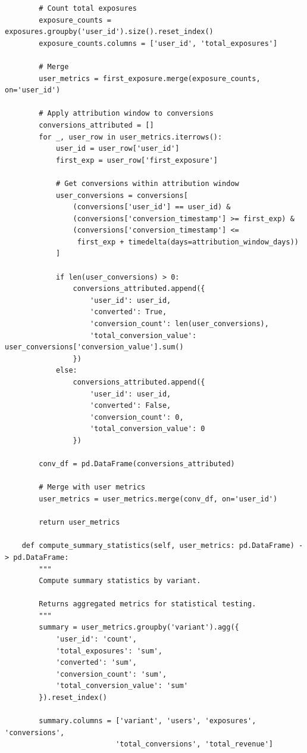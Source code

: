 \begin{lstlisting}
        # Count total exposures
        exposure_counts = exposures.groupby('user_id').size().reset_index()
        exposure_counts.columns = ['user_id', 'total_exposures']

        # Merge
        user_metrics = first_exposure.merge(exposure_counts, on='user_id')

        # Apply attribution window to conversions
        conversions_attributed = []
        for _, user_row in user_metrics.iterrows():
            user_id = user_row['user_id']
            first_exp = user_row['first_exposure']

            # Get conversions within attribution window
            user_conversions = conversions[
                (conversions['user_id'] == user_id) &
                (conversions['conversion_timestamp'] >= first_exp) &
                (conversions['conversion_timestamp'] <=
                 first_exp + timedelta(days=attribution_window_days))
            ]

            if len(user_conversions) > 0:
                conversions_attributed.append({
                    'user_id': user_id,
                    'converted': True,
                    'conversion_count': len(user_conversions),
                    'total_conversion_value': user_conversions['conversion_value'].sum()
                })
            else:
                conversions_attributed.append({
                    'user_id': user_id,
                    'converted': False,
                    'conversion_count': 0,
                    'total_conversion_value': 0
                })

        conv_df = pd.DataFrame(conversions_attributed)

        # Merge with user metrics
        user_metrics = user_metrics.merge(conv_df, on='user_id')

        return user_metrics

    def compute_summary_statistics(self, user_metrics: pd.DataFrame) -> pd.DataFrame:
        """
        Compute summary statistics by variant.

        Returns aggregated metrics for statistical testing.
        """
        summary = user_metrics.groupby('variant').agg({
            'user_id': 'count',
            'total_exposures': 'sum',
            'converted': 'sum',
            'conversion_count': 'sum',
            'total_conversion_value': 'sum'
        }).reset_index()

        summary.columns = ['variant', 'users', 'exposures', 'conversions',
                          'total_conversions', 'total_revenue']


\end{lstlisting}

